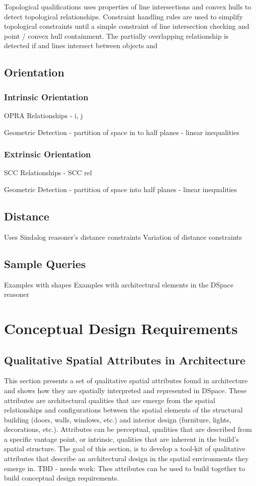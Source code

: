 \documentclass[12pt]{ucthesis}
\begin{document}
Topological qualifications uses properties of line intersections and convex hulls to detect topological relationships. Constraint handling rules are used to simplify topological constraints until a simple constraint of line intersection checking and point / convex hull containment. The partially overlapping relationship is detected if and lines intersect between objects and 

\section{Orientation}

\subsection{Intrinsic Orientation}
OPRA
Relationships
  - i, j

Geometric Detection
  - partition of space in to half planes
  - linear inequalities

\subsection{Extrinsic Orientation}
SCC
Relationships
  - SCC rel
  
Geometric Detection
  - partition of space into half planes
  - linear inequalities

\section{Distance}
Uses Sindalog reasoner's distance constraints
Variation of distance constraints

\section{Sample Queries}
Examples with shapes
Examples with architectural elements in the DSpace reasoner


\chapter{Conceptual Design Requirements}


\section{Qualitative Spatial Attributes in Architecture}
This section presents a set of qualitative spatial attributes found in architecture and shows how they are spatially interpreted and represented in DSpace. These attributes are architectural qualities that are emerge from the spatial relationships and configurations between the spatial elements of the structural building (doors, walls, windows, etc.) and interior design (furniture, lights, decorations, etc.). Attributes can be perceptual, qualities that are described from a specific vantage point, or intrinsic, qualities that are inherent in the build's spatial structure. The goal of this section, is to develop a tool-kit of qualitative attributes that describe an architectural design in the spatial environments they emerge in. TBD - needs work: Thes attributes can be used to build together to build conceptual design requirements.
\end{document}
